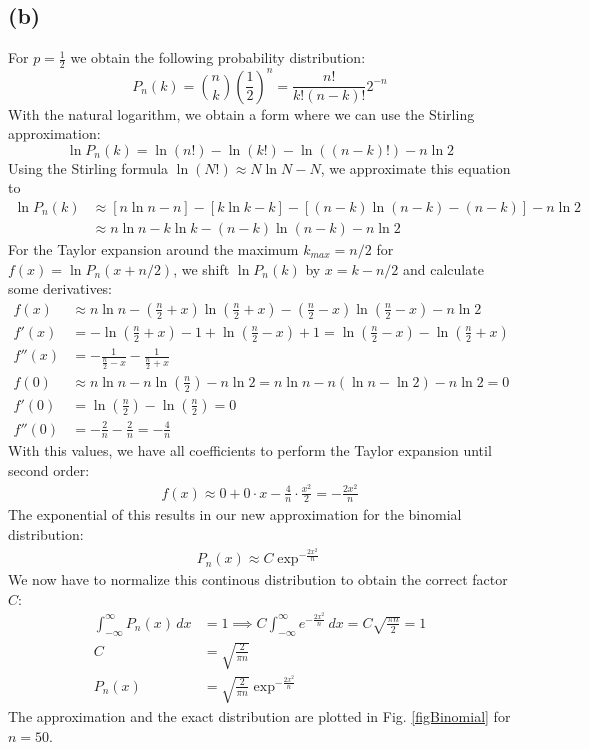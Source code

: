 \documentclass{article}
\begin{document}
\subsection*{(b)}
For $p=\frac{1}{2}$ we obtain the following probability distribution:
\[
P_n(k) = \binom{n}{k} \left(\frac{1}{2}\right)^n = \frac{n!}{k!(n-k)!} 2^{-n}
\]
With the natural logarithm, we obtain a form where we can use the Stirling approximation:
\[
\ln P_n(k) = \ln(n!) - \ln(k!) - \ln((n-k)!) - n \ln 2
\]
Using the Stirling formula $\ln(N!) \approx N \ln N - N$, we approximate this equation to
\begin{align}
    \ln P_n(k) & \approx \left[n\ln n - n \right] - \left[k\ln k - k\right] - \left[(n-k)\ln(n-k) - (n-k) \right] - n \ln 2 \\
               & \approx n\ln n - k\ln k - (n-k)\ln(n-k) - n\ln 2
\end{align}
For the Taylor expansion around the maximum $k_{max} = n/2$ for $f(x) = \ln P_n(x + n/2)$, we shift $\ln P_n(k)$ by $x = k - n/2$ and calculate some derivatives:
\begin{align}
f(x) &\approx n\ln n - \left(\frac{n}{2}+x\right)\ln\left(\frac{n}{2}+x\right) - \left(\frac{n}{2}-x\right)\ln\left(\frac{n}{2}-x\right) - n\ln 2 \\
f'(x) &= -\ln\left(\frac{n}{2}+x\right) - 1 + \ln\left(\frac{n}{2}-x\right) + 1 = \ln\left(\frac{n}{2}-x\right) - \ln\left(\frac{n}{2}+x\right) \\
f''(x) &= - \frac{1}{\frac{n}{2}-x} - \frac{1}{\frac{n}{2}+x} \\
f(0) &\approx n\ln n - n\ln\left(\frac{n}{2}\right) - n\ln 2 = n\ln n - n(\ln n - \ln 2) - n\ln 2 = 0 \\
f'(0) &= \ln\left(\frac{n}{2}\right) - \ln\left(\frac{n}{2}\right) = 0 \\
f''(0) &= - \frac{2}{n} - \frac{2}{n} = - \frac{4}{n}
\end{align}
With this values, we have all coefficients to perform the Taylor expansion until second order:
\begin{align}
    f(x) \approx 0  +  0 \cdot x - \frac{4}{n} \cdot  \frac{x^2}{2} = - \frac{2 x^2}{n}
\end{align}
The exponential of this results in our new approximation for the binomial distribution:
\begin{align}
    P_n(x) \approx C \exp^{-\frac{2 x^2}{n}}
\end{align}
We now have to normalize this continous distribution to obtain the correct factor $C$:
\begin{align}
    \int_{-\infty}^{\infty} P_n(x) \, dx &= 1 \implies C \int_{-\infty}^{\infty} e^{-\frac{2x^2}{n}} \, dx = C \sqrt{\frac{\pi n}{2}} = 1 \\
    C &= \sqrt{\frac{2}{\pi n}} \\
    P_n(x) &= \sqrt{\frac{2}{\pi n}} \exp^{-\frac{2 x^2}{n}}
\end{align}
The approximation and the exact distribution are plotted in Fig. \ref{figBinomial} for $n=50$.
\end{document}
